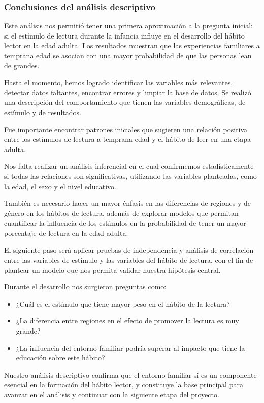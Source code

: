 \documentclass[aps,reprint]{revtex4-2}
\begin{document}
\subsubsection{Conclusiones del análisis descriptivo}


Este análisis nos permitió tener una primera aproximación a la pregunta inicial: si el estímulo de lectura durante la infancia influye en el desarrollo del hábito lector en la edad adulta. Los resultados muestran que las experiencias familiares a temprana edad se asocian con una mayor probabilidad de que las personas lean de grandes.

Hasta el momento, hemos logrado identificar las variables más relevantes, detectar datos faltantes, encontrar errores y limpiar la base de datos. Se realizó una descripción del comportamiento que tienen las variables demográficas, de estímulo y de resultados.

Fue importante encontrar patrones iniciales que sugieren una relación positiva entre los estímulos de lectura a temprana edad y el hábito de leer en una etapa adulta.

Nos falta realizar un análisis inferencial en el cual confirmemos estadísticamente si todas las relaciones son significativas, utilizando las variables planteadas, como la edad, el sexo y el nivel educativo.

También es necesario hacer un mayor énfasis en las diferencias de regiones y de género en los hábitos de lectura, además de explorar modelos que permitan cuantificar la influencia de los estímulos en la probabilidad de tener un mayor porcentaje de lectura en la edad adulta.

El siguiente paso será aplicar pruebas de independencia y análisis de correlación entre las variables de estímulo y las variables del hábito de lectura, con el fin de plantear un modelo que nos permita validar nuestra hipótesis central.

Durante el desarrollo nos surgieron preguntas como:
\begin{itemize}
    \item ¿Cuál es el estímulo que tiene mayor peso en el hábito de la lectura?
    \item ¿La diferencia entre regiones en el efecto de promover la lectura es muy grande?
    \item ¿La influencia del entorno familiar podría superar al impacto que tiene la educación sobre este hábito?
\end{itemize}

Nuestro análisis descriptivo confirma que el entorno familiar sí es un componente esencial en la formación del hábito lector, y constituye la base principal para avanzar en el análisis y continuar con la siguiente etapa del proyecto.
\end{document}
